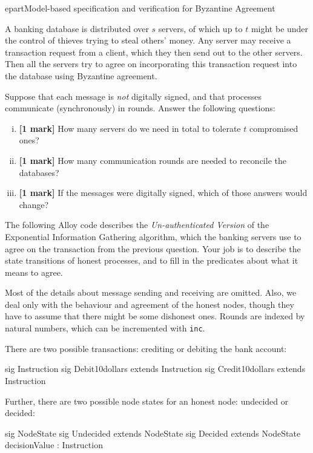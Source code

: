 epart{Model-based specification and verification for Byzantine Agreement}


A banking database is distributed over $s$ servers, of which up to $t$ might be under the control of thieves trying to steal others' money.  Any server may receive a transaction request from a client, which they then send out to the other servers.  Then all the servers try to agree on incorporating this transaction request into the database using Byzantine agreement.

Suppose that each message is \emph{not} digitally signed, and that processes communicate (synchronously) in rounds. Answer the following questions:
		\begin{enumerate}[(i)]
		\item \textbf{[1 mark]} How many servers do we need in total to tolerate $t$ compromised ones?
		\item \textbf{[1 mark]} How many communication rounds are needed to reconcile the databases?
		\item \textbf{[1 mark]} If the messages were digitally signed, which of those answers would change?  
		\end{enumerate}


The following Alloy code  describes the \emph{Un-authenticated Version} of the Exponential Information Gathering algorithm, which the banking servers use to agree on the transaction from the previous question.    Your job is to describe the state transitions of honest processes, and to fill in the predicates about what it means to agree.  

Most of  the details about message sending and receiving are omitted.  Also, we deal only with the behaviour and agreement of the honest nodes, though they have to assume that there might be some dishonest ones.  Rounds are indexed by natural numbers, which can be incremented with \texttt{inc}.

There are two possible transactions: crediting or debiting the bank account:

\begin{alloy}
sig Instruction {}
sig Debit10dollars extends Instruction {}
sig Credit10dollars extends Instruction {}
\end{alloy}

Further, there are two possible node states for an honest node: undecided or decided:

\begin{alloy}
sig NodeState {}
sig Undecided extends NodeState {}
sig Decided extends NodeState {
   decisionValue  : Instruction  
}
\end{alloy}

